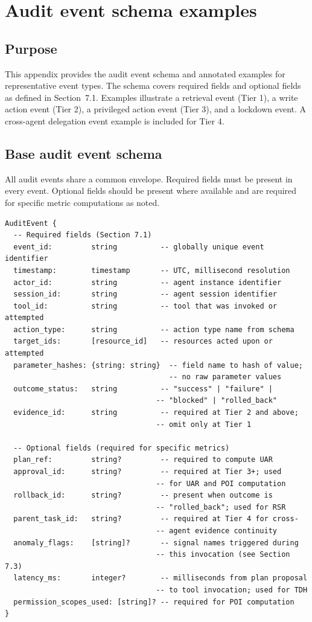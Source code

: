 \documentclass[11pt]{article}
\begin{document}
\section{Audit event schema examples}
\subsection{Purpose}
This appendix provides the audit event schema and annotated examples for representative event types. The schema covers required fields and optional fields as defined in Section~7.1. Examples illustrate a retrieval event (Tier 1), a write action event (Tier 2), a privileged action event (Tier 3), and a lockdown event. A cross-agent delegation event example is included for Tier 4.

\subsection{Base audit event schema}
All audit events share a common envelope. Required fields must be present in every event. Optional fields should be present where available and are required for specific metric computations as noted.

\begin{verbatim}
AuditEvent {
  -- Required fields (Section 7.1)
  event_id:         string          -- globally unique event identifier
  timestamp:        timestamp       -- UTC, millisecond resolution
  actor_id:         string          -- agent instance identifier
  session_id:       string          -- agent session identifier
  tool_id:          string          -- tool that was invoked or attempted
  action_type:      string          -- action type name from schema
  target_ids:       [resource_id]   -- resources acted upon or attempted
  parameter_hashes: {string: string}  -- field name to hash of value;
                                      -- no raw parameter values
  outcome_status:   string          -- "success" | "failure" |
                                   -- "blocked" | "rolled_back"
  evidence_id:      string          -- required at Tier 2 and above;
                                   -- omit only at Tier 1

  -- Optional fields (required for specific metrics)
  plan_ref:         string?         -- required to compute UAR
  approval_id:      string?         -- required at Tier 3+; used
                                   -- for UAR and POI computation
  rollback_id:      string?         -- present when outcome is
                                   -- "rolled_back"; used for RSR
  parent_task_id:   string?         -- required at Tier 4 for cross-
                                   -- agent evidence continuity
  anomaly_flags:    [string]?       -- signal names triggered during
                                   -- this invocation (see Section 7.3)
  latency_ms:       integer?        -- milliseconds from plan proposal
                                   -- to tool invocation; used for TDH
  permission_scopes_used: [string]? -- required for POI computation
}
\end{verbatim}
\end{document}
